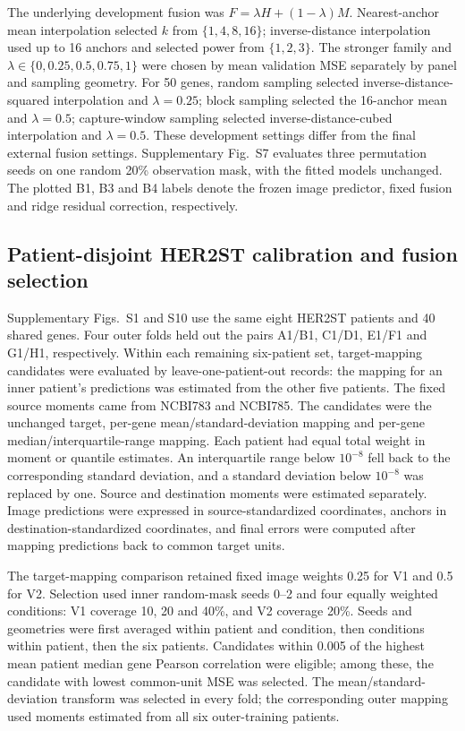 The underlying development fusion was $F=\lambda H+(1-\lambda)M$. Nearest-anchor mean interpolation selected $k$ from $\{1,4,8,16\}$; inverse-distance interpolation used up to 16 anchors and selected power from $\{1,2,3\}$. The stronger family and $\lambda\in\{0, 0.25, 0.5, 0.75,1\}$ were chosen by mean validation MSE separately by panel and sampling geometry. For 50 genes, random sampling selected inverse-distance-squared interpolation and $\lambda=0.25$; block sampling selected the 16-anchor mean and $\lambda=0.5$; capture-window sampling selected inverse-distance-cubed interpolation and $\lambda=0.5$. These development settings differ from the final external fusion settings. Supplementary Fig.~S7 evaluates three permutation seeds on one random 20\% observation mask, with the fitted models unchanged. The plotted B1, B3 and B4 labels denote the frozen image predictor, fixed fusion and ridge residual correction, respectively.

\subsection{Patient-disjoint HER2ST calibration and fusion selection}
Supplementary Figs.~S1 and S10 use the same eight HER2ST patients and 40 shared genes. Four outer folds held out the pairs A1/B1, C1/D1, E1/F1 and G1/H1, respectively. Within each remaining six-patient set, target-mapping candidates were evaluated by leave-one-patient-out records: the mapping for an inner patient's predictions was estimated from the other five patients. The fixed source moments came from NCBI783 and NCBI785. The candidates were the unchanged target, per-gene mean/standard-deviation mapping and per-gene median/interquartile-range mapping. Each patient had equal total weight in moment or quantile estimates. An interquartile range below $10^{-8}$ fell back to the corresponding standard deviation, and a standard deviation below $10^{-8}$ was replaced by one. Source and destination moments were estimated separately. Image predictions were expressed in source-standardized coordinates, anchors in destination-standardized coordinates, and final errors were computed after mapping predictions back to common target units.

The target-mapping comparison retained fixed image weights 0.25 for V1 and 0.5 for V2. Selection used inner random-mask seeds 0--2 and four equally weighted conditions: V1 coverage 10, 20 and 40\%, and V2 coverage 20\%. Seeds and geometries were first averaged within patient and condition, then conditions within patient, then the six patients. Candidates within 0.005 of the highest mean patient median gene Pearson correlation were eligible; among these, the candidate with lowest common-unit MSE was selected. The mean/standard-deviation transform was selected in every fold; the corresponding outer mapping used moments estimated from all six outer-training patients.

